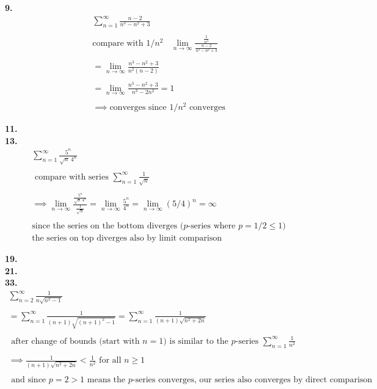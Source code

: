 \documentclass{article}
\begin{document}
\newpage


\noindent
\textbf{
9.
}
\\
\begin{gather*}
\sum_{n=1}^{\infty} \frac{n-2}{n^3-n^2+3}
\\
\\
\text{compare with } 1/n^2
~~~~
\lim_{n \to \infty} \frac{\frac{1}{n^2}}{\frac{n-2}{n^3-n^2+3}}
\\
\\
=\lim_{n \to \infty} \frac{n^3-n^2+3}{n^2(n-2)}
\\
\\
=\lim_{n \to \infty} \frac{n^3-n^2+3}{n^3-2n^2}=1
\\
\\
\implies
\text{converges since $1/n^2$ converges}
\end{gather*}


\noindent
\textbf{
11.
}
\\


\noindent
\textbf{
13.
}
\\
\begin{gather*}
\sum_{n=1}^{\infty} \frac{5^n}{\sqrt{n}~4^n}
\\
\\
\text{ compare with series }
\sum_{n=1}^{\infty} \frac{1}{\sqrt{n}}
\\
\\
\implies
\lim_{n \to \infty} \frac{\frac{5^n}{\sqrt{n}~4^n}}{\frac{1}{\sqrt{n}}}
= \lim_{n \to \infty} \frac{5^n}{4^n}= \lim_{n \to \infty}(5/4)^n=\infty
\\
\\
\text{since the series on the bottom diverges ($p$-series where $p=1/2\leq1$)}
\\
\text{the series on top diverges also by limit comparison}
\end{gather*}


\noindent
\textbf{
19.
}
\\


\noindent
\textbf{
21.
}
\\


\noindent
\textbf{
33.
}
\\
\begin{gather*}
\sum_{n=2}^{\infty} \frac{1}{n\sqrt{n^2-1}}
\\
\\
=\sum_{n=1}^{\infty} \frac{1}{(n+1)\sqrt{(n+1)^2-1}}
=\sum_{n=1}^{\infty} \frac{1}{(n+1)\sqrt{n^2+2n}}
\\
\\
\text{ after change of bounds (start with $n=1$) is similar to the $p$-series }
\sum_{n=1}^{\infty} \frac{1}{n^2}
\\
\\
\implies
\frac{1}{(n+1)\sqrt{n^2+2n}}<\frac{1}{n^2}
\text{ for all } n \geq 1
\\
\\
\text{ and since $p=2>1$ means the $p$-series converges, our series also converges
by direct comparison}
\end{gather*}
\end{document}
